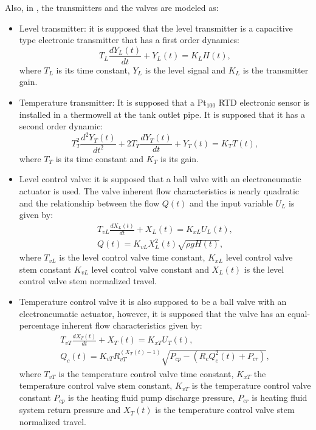 Also, in \citet{Alfaro2016}, the transmitters and the valves are modeled as:
\begin{itemize}
	\item Level transmitter: it is supposed that the level transmitter is a capacitive type electronic transmitter that has a first order dynamics:
		\begin{equation*}
			T_L \frac{d Y_L(t)}{dt} + Y_L(t) = K_L H(t),
		\end{equation*}
		where $T_L$ is its time constant, $Y_L$ is the level signal and $K_L$ is the transmitter gain.
	\item Temperature transmitter: It is supposed that a Pt$_{100}$ RTD electronic sensor is installed in a thermowell at the tank outlet pipe. It is supposed that it has a second order dynamic:
		\begin{equation*}
			T_{T}^2 \frac{d^2 Y_T(t)}{dt^2} + 2T_T \frac{d Y_T(t)}{dt} + Y_T(t) = K_T T(t),
		\end{equation*}
		where $T_T$ is its time constant and $K_T$ is its gain.
	\item Level control valve: it is supposed that a ball valve with an electroneumatic actuator is used. The valve	inherent flow characteristics is nearly quadratic and the relationship between the flow $Q(t)$ and the input variable $U_L$ is given by:
		\begin{align*}
			T_{vL} \frac{d X_L(t)}{dt} + X_L(t) = K_{xL} U_L(t),\\
			Q(t) = K_{vL} X_L^2(t)\sqrt{\rho g H(t)},
		\end{align*}
		where $T_{vL}$ is the level control valve time constant, $K_{xL}$ level control valve stem constant $K_{vL}$ level control valve constant and $X_L(t)$ is the level control valve stem normalized travel.
	\item Temperature control valve it is also supposed to be a ball valve with an electroneumatic actuator, however, it is supposed that the valve has an equal-percentage inherent flow characteristics given by:
		\begin{align*}
			T_{vT} \frac{d X_T(t)}{dt} + X_T(t) = K_{xT} U_T(t),\\
			Q_c(t) = K_{vT}R_{vT}^{\left( X_T(t) -1 \right) } \sqrt{P_{cp} - \left(R_c Q^2_c(t)+P_{cr} \right) },
		\end{align*}
		where $T_{vT}$ is the temperature control valve time constant, $K_{xT}$ the temperature control valve stem constant, $K_{vT}$ is the temperature control valve constant $P_{cp}$ is the heating fluid pump discharge pressure, $P_{cr}$ is heating fluid system return pressure and $X_T(t)$ is the temperature control valve stem normalized travel.
\end{itemize}

